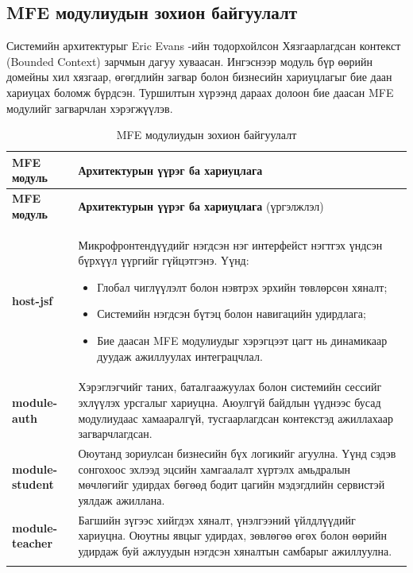 \subsection{MFE модулиудын зохион байгуулалт}

Системийн архитектурыг Eric Evans \cite{evans2003}-ийн тодорхойлсон Хязгаарлагдсан контекст (Bounded Context) зарчмын дагуу хуваасан. Ингэснээр модуль бүр өөрийн домейны хил хязгаар, өгөгдлийн загвар болон бизнесийн хариуцлагыг бие даан хариуцах боломж бүрдсэн. Туршилтын хүрээнд дараах долоон бие даасан MFE модулийг загварчлан хэрэгжүүлэв.

\begin{longtable}{p{3.5cm} p{12.5cm}}
\caption{MFE модулиудын зохион байгуулалт} \label{tab:mfe} \\
\toprule
\textbf{MFE модуль} & \textbf{Архитектурын үүрэг ба хариуцлага} \\ 
\midrule
\endfirsthead
\toprule
\textbf{MFE модуль} & \textbf{Архитектурын үүрэг ба хариуцлага} (үргэлжлэл) \\ 
\midrule
\endhead
\bottomrule
\endfoot

\textbf{host-jsf} & Микрофронтендүүдийг нэгдсэн нэг интерфейст нэгтгэх үндсэн бүрхүүл үүргийг гүйцэтгэнэ. Үүнд:
\begin{itemize}
\item Глобал чиглүүлэлт болон нэвтрэх эрхийн төвлөрсөн хяналт;
\item Системийн нэгдсэн бүтэц болон навигацийн удирдлага;
\item Бие даасан MFE модулиудыг хэрэгцээт цагт нь динамикаар дуудаж ажиллуулах интеграцчлал.
\end{itemize} \\ \addlinespace

\textbf{module-auth} & Хэрэглэгчийг таних, баталгаажуулах болон системийн сессийг эхлүүлэх урсгалыг хариуцна. Аюулгүй байдлын үүднээс бусад модулиудаас хамааралгүй, тусгаарлагдсан контекстэд ажиллахаар загварчлагдсан. \\ \addlinespace

\textbf{module-student} & Оюутанд зориулсан бизнесийн бүх логикийг агуулна. Үүнд сэдэв сонгохоос эхлээд эцсийн хамгаалалт хүртэлх амьдралын мөчлөгийг удирдах бөгөөд бодит цагийн мэдэгдлийн сервистэй уялдаж ажиллана. \\ \addlinespace

\textbf{module-teacher} & Багшийн зүгээс хийгдэх хяналт, үнэлгээний үйлдлүүдийг хариуцна. Оюутны явцыг удирдах, зөвлөгөө өгөх болон өөрийн удирдаж буй ажлуудын нэгдсэн хяналтын самбарыг ажиллуулна. \\ \addlinespace


\end{longtable}
